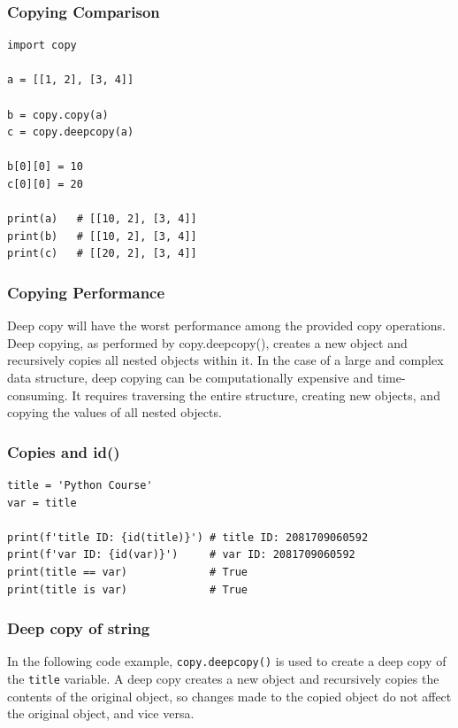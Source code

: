 \subsubsection{Copying Comparison}
\begin{codebox}
\begin{verbatim}
import copy
 
a = [[1, 2], [3, 4]]
 
b = copy.copy(a)
c = copy.deepcopy(a)
 
b[0][0] = 10
c[0][0] = 20

print(a)   # [[10, 2], [3, 4]]
print(b)   # [[10, 2], [3, 4]]
print(c)   # [[20, 2], [3, 4]]
\end{verbatim}
\end{codebox}

\subsubsection{Copying Performance}
Deep copy will have the worst performance among the provided copy operations. Deep copying, as performed by copy.deepcopy(), creates a new object and recursively copies all nested objects within it. In the case of a large and complex data structure, deep copying can be computationally expensive and time-consuming. It requires traversing the entire structure, creating new objects, and copying the values of all nested objects.

\subsubsection{Copies and id()}
\begin{codebox}
\begin{verbatim}
title = 'Python Course'
var = title
 
print(f'title ID: {id(title)}') # title ID: 2081709060592
print(f'var ID: {id(var)}')     # var ID: 2081709060592
print(title == var)             # True
print(title is var)             # True
\end{verbatim}
\end{codebox}

\subsubsection{Deep copy of string}
In the following code example, \texttt{copy.deepcopy()} is used to create a deep copy of the \texttt{title} variable. A deep copy creates a new object and recursively copies the contents of the original object, so changes made to the copied object do not affect the original object, and vice versa.\\

